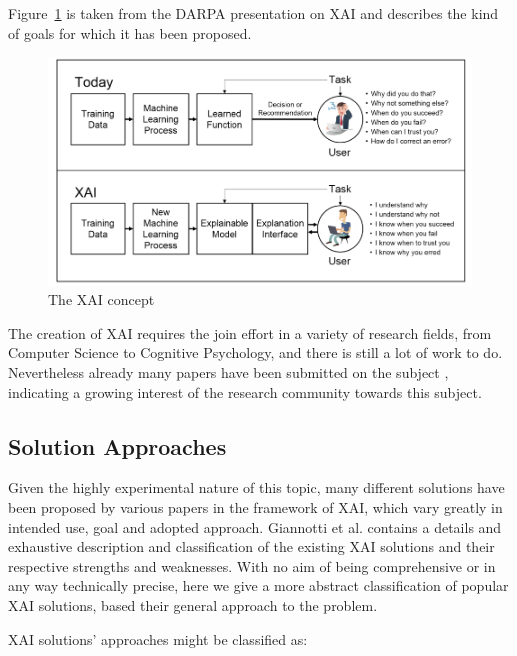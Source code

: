 \documentclass[conference]{IEEEtran}
\newcommand{\cit}{\todo[tickmarkheight=0.2cm]{cit}}
\begin{document}
Figure~\ref{fig:xai} is taken from the DARPA presentation on XAI and describes the kind of goals for which it has been proposed.


\begin{figure}[h!] \centering \includegraphics[width=\linewidth]{images/xai.png}
    \caption{The XAI concept} \label{fig:xai} \end{figure}

The creation of XAI requires the join effort in a variety of research fields, from Computer Science to Cognitive
Psychology, and there is still a lot of work to do. Nevertheless already many papers have been submitted on the subject \cit, indicating a growing interest of the research community towards this subject.

\subsection{Solution Approaches}

Given the highly experimental nature of this topic, many different solutions have been proposed by various papers in the framework of XAI, which vary greatly in intended use, goal and adopted approach. Giannotti et al. \cit contains a details and exhaustive description and classification of the existing XAI solutions and their respective strengths and weaknesses. With no aim of being comprehensive or in any way technically precise, here we give a more abstract classification of popular XAI solutions, based their general approach to the problem.

XAI solutions' approaches might be classified as:
\end{document}
